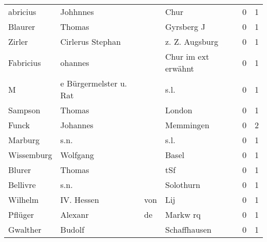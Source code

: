 \begin{tabular}{llllrr}
                 abricius &                           Johhnnes &             &                                        Chur &          0 &         1 \\
                  Blaurer &                             Thomas &             &                                  Gyrsberg J &          0 &         1 \\
                   Zirler &                   Cirlerus Stephan &             &                              z. Z. Augsburg &          0 &         1 \\
                Fabricius &                            ohannes &             &                         Chur im ext erwähnt &          0 &         1 \\
                        M &             e Bürgermelster u. Rat &             &                                        s.l. &          0 &         1 \\
                  Sampson &                             Thomas &             &                                      London &          0 &         1 \\
                    Funck &                           Johannes &             &                                   Memmingen &          0 &         2 \\
                  Marburg &                               s.n. &             &                                        s.l. &          0 &         1 \\
               Wissemburg &                           Wolfgang &             &                                       Basel &          0 &         1 \\
                   Blurer &                             Thomas &             &                                         tSf &          0 &         1 \\
                 Bellivre &                               s.n. &             &                                   Solothurn &          0 &         1 \\
                  Wilhelm &                        IV.  Hessen &         von &                                         Lij &          0 &         1 \\
                  Pflüger &                            Alexanr &          de &                                    Markw rq &          0 &         1 \\
                 Gwalther &                             Budolf &             &                                Schaffhausen &          0 &         1 \\

\end{tabular}
